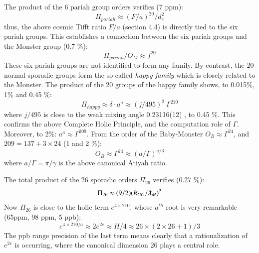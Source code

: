 \documentclass[twoside,draft]{article}
\begin{document}
\begin{sloppypar}
The product of the 6 pariah group orders verifies (7 ppm):
\begin{equation}
\Pi_{pariah} \approx (F/a)^{20}/d_e^2
\end{equation}
thus, the above cosmic Tifft ratio $F/a$ (section 4.4) is directly tied to the six pariah groups. This establishes a connection between the six pariah groups and the Monster group (0.7 \%):
\begin{equation}
\Pi_{pariah}/O_M\approx f^{20}
\end{equation}
These six pariah groups are not identified to form any family. By contrast, the 20 normal sporadic groups form the so-called \textit {happy family} which is closely related to the Monster. The product of the 20 groups of the happy family shows, to 0.015\%, 1\% and 0.45 \%:
\begin{equation}
\Pi_{happy} \approx \delta \cdot a^{a} \approx (j/495)^2~ \Gamma^{210}
\end{equation}
where $j/495$ is close to the weak mixing angle 0.23116(12) \cite{Tanabashi}, to 0.45 \%. This confirms the above Complete Holic Principle, and the computation role of $\Gamma$. Moreover, to 2\%: $a^a \approx \Gamma^{209}$. From the order of the Baby-Monster $O_B\approx\Gamma^{24}$, and $209 = 137 + 3\times 24$ (1 and 2 \%):
\begin{equation}
O_B \approx \Gamma^{24} \approx  (a/\Gamma)^{a/3}
\end{equation}
 where $a/\Gamma = \pi/\gamma $ is the above canonical Atiyah ratio. 

The total product of the 26 sporadic orders $\Pi_{26}$ verifies (0.27 \%):
\begin{equation}
\Pi_{26} \approx (9/2)(R_{GC}/\lambdabar_M )^2
\end{equation}
Now $\Pi_{26}$ is close to the holic term $e^{4 \times 210}$, whose $a^{th}$ root is very remarkable (65ppm, 98 ppm, 5 ppb):
\begin{equation}
e^{4 \times 210/a} \approx 2e^{2e} \approx H/4 \approx 26 \times (2 \times 26 + 1)/3
\end{equation}
The ppb range precision of the last term means clearly that a rationalization of $e^{2e}$ is occurring, where the canonical dimension 26 plays a central role.


\end{sloppypar}
\end{document}
